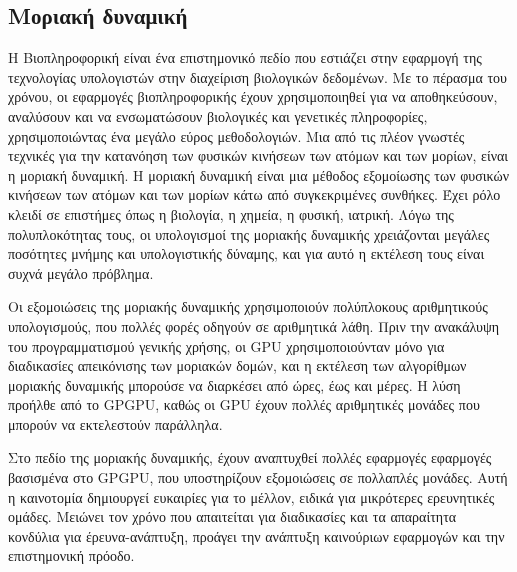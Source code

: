 \subsection{Μοριακή δυναμική}
Η Βιοπληροφορική είναι ένα επιστημονικό πεδίο που εστιάζει στην εφαρμογή της τεχνολογίας υπολογιστών στην διαχείριση βιολογικών δεδομένων. Με το πέρασμα του χρόνου, οι εφαρμογές βιοπληροφορικής έχουν χρησιμοποιηθεί για να αποθηκεύσουν, αναλύσουν και να ενσωματώσουν βιολογικές και γενετικές πληροφορίες, χρησιμοποιώντας ένα μεγάλο εύρος μεθοδολογιών. Μια από τις πλέον γνωστές τεχνικές για την κατανόηση των φυσικών κινήσεων των ατόμων και των μορίων, είναι η μοριακή δυναμική. Η μοριακή δυναμική είναι μια μέθοδος εξομοίωσης των φυσικών κινήσεων των ατόμων και των μορίων κάτω από συγκεκριμένες συνθήκες. Έχει ρόλο κλειδί σε επιστήμες όπως η βιολογία, η χημεία, η φυσική, ιατρική. Λόγω της πολυπλοκότητας τους, οι υπολογισμοί της μοριακής δυναμικής χρειάζονται μεγάλες ποσότητες μνήμης και υπολογιστικής δύναμης, και για αυτό η εκτέλεση τους είναι συχνά μεγάλο πρόβλημα.\cite{bioinformatics-3} 

Οι εξομοιώσεις της μοριακής δυναμικής χρησιμοποιούν πολύπλοκους αριθμητικούς υπολογισμούς, που πολλές φορές οδηγούν σε αριθμητικά λάθη. Πριν την ανακάλυψη του προγραμματισμού γενικής χρήσης, οι GPU χρησιμοποιούνταν μόνο για διαδικασίες απεικόνισης των μοριακών δομών, και η εκτέλεση των αλγορίθμων μοριακής δυναμικής μπορούσε να διαρκέσει από ώρες, έως και μέρες. Η λύση προήλθε από το GPGPU, καθώς οι GPU έχουν πολλές αριθμητικές μονάδες που μπορούν να εκτελεστούν παράλληλα.

Στο πεδίο της μοριακής δυναμικής, έχουν αναπτυχθεί πολλές εφαρμογές εφαρμογές βασισμένα στο GPGPU, που υποστηρίζουν εξομοιώσεις σε πολλαπλές μονάδες. Αυτή η καινοτομία δημιουργεί ευκαιρίες για το μέλλον, ειδικά για μικρότερες ερευνητικές ομάδες. Μειώνει τον χρόνο που απαιτείται για διαδικασίες και τα απαραίτητα κονδύλια για έρευνα-ανάπτυξη, προάγει την ανάπτυξη καινούριων εφαρμογών και την επιστημονική πρόοδο.\cite{bioinformatics-4}
